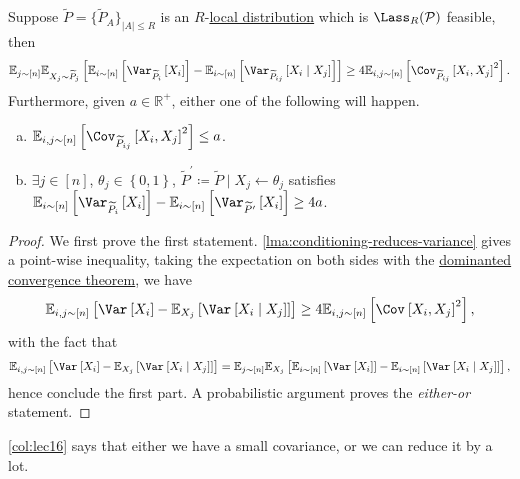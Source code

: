 \begin{corollary}\label{col:lec16}
	Suppose \(\widetilde{P} =\{ \widetilde{P} _A \}_{\left\vert A \right\vert \leq R} \) is an \(R\)-\hyperref[def:local-distribution]{local distribution} which is \(\Lass_R(\mathcal{P})\) feasible, then
	\[
		\mathbb{E}_{j\sim [n]} \mathbb{E}_{X_j\sim \widetilde{P} _j}\left[ \mathbb{E}_{i\sim [n]}\left[\Var_{\widetilde{P} _i}\left[X_i \right]\right] - \mathbb{E}_{i\sim [n]}\left[\Var_{\widetilde{P} _{ij}}\left[X_i \mid X_j \right]\right] \right] \geq 4 \mathbb{E}_{i, j\sim [n]}\left[\Cov_{\widetilde{P} _{ij}}\left[ X_i, X_j\right]^{2} \right].
	\]
	Furthermore, given \(a\in \mathbb{R} ^+\), either one of the following will happen.
	\begin{enumerate}[(a)]
		\item \(\mathbb{E}_{i, j\sim [n]}\left[\Cov_{\widetilde{P} _{ij}}\left[ X_i, X_j\right]^{2} \right] \leq a\).
		\item \(\exists j\in [n]\), \(\theta _j\in \left\{ 0, 1 \right\} \), \(\widetilde{P} ^\prime \coloneqq \widetilde{P} \mid X_j \gets \theta _j\) satisfies \(\mathbb{E}_{i\sim [n]}\left[\Var_{\widetilde{P} _i}\left[X_i \right]\right] - \mathbb{E}_{i\sim [n]}\left[\Var_{\widetilde{P}^\prime }\left[X_i \right]\right] \geq 4a\).
	\end{enumerate}
\end{corollary}
\begin{proof}
	We first prove the first statement. \autoref{lma:conditioning-reduces-variance} gives a point-wise inequality, taking the expectation on both sides with the \href{https://en.wikipedia.org/wiki/Dominated_convergence_theorem}{dominanted convergence theorem}, we have
	\[
		\mathbb{E}_{i, j\sim [n]}\left[\Var_{}\left[X_i \right] - \mathbb{E}_{X_j}\left[\Var_{}\left[X_i \mid X_j \right] \right] \right] \geq 4 \mathbb{E}_{i, j\sim [n]}\left[\Cov_{}\left[X_i, X_j \right] ^{2} \right],
	\]
	with the fact that
	\[
		\mathbb{E}_{i, j\sim [n]}\left[\Var_{}\left[X_i \right] - \mathbb{E}_{X_j}\left[\Var_{}\left[X_i \mid X_j \right] \right] \right] = \mathbb{E}_{j\sim [n]}\mathbb{E}_{X_j}\left[\mathbb{E}_{i\sim [n]}\left[\Var_{}\left[X_i \right] \right] - \mathbb{E}_{i\sim [n]}\left[\Var_{}\left[X_i\mid X_j \right] \right] \right],
	\]
	hence conclude the first part. A probabilistic argument proves the \emph{either-or} statement.
\end{proof}

\begin{remark}
	\autoref{col:lec16} says that either we have a small covariance, or we can reduce it by a lot.
\end{remark}

